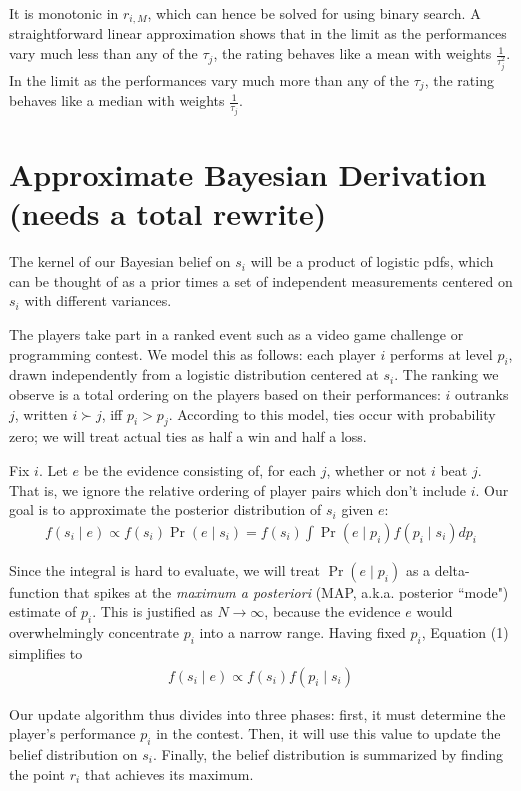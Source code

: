 \documentclass{article}
\begin{document}
It is monotonic in $r_{i,M}$, which can hence be solved for using binary search. A straightforward linear approximation shows that in the limit as the performances vary much less than any of the $\tau_j$, the rating behaves like a mean with weights $\frac{1}{\tau_j^2}$. In the limit as the performances vary much more than any of the $\tau_j$, the rating behaves like a median with weights $\frac{1}{\tau_j}$.

\section{Approximate Bayesian Derivation (needs a total rewrite)}

The kernel of our Bayesian belief on $s_i$ will be a product of logistic pdfs, which can be thought of as a prior times a set of independent measurements centered on $s_i$ with different variances.

The players take part in a ranked event such as a video game challenge or programming contest. We model this as follows: each player $i$ performs at level $p_i$, drawn independently from a logistic distribution centered at $s_i$. The ranking we observe is a total ordering on the players based on their performances: $i$ outranks $j$, written $i \succ j$, iff $p_i > p_j$. According to this model, ties occur with probability zero; we will treat actual ties as half a win and half a loss.

Fix $i$. Let $e$ be the evidence consisting of, for each $j$, whether or not $i$ beat $j$. That is, we ignore the relative ordering of player pairs which don't include $i$. Our goal is to approximate the posterior distribution of $s_i$ given $e$:
\begin{align}
f(s_i\mid e) \propto f(s_i)\Pr(e\mid s_i) = f(s_i)\int \Pr(e\mid p_i)f(p_i\mid s_i)dp_i
\end{align}

Since the integral is hard to evaluate, we will treat $\Pr(e\mid p_i)$ as a delta-function that spikes at the \emph{maximum a posteriori} (MAP, a.k.a. posterior ``mode") estimate of $p_i$. This is justified as $N \rightarrow \infty$, because the evidence $e$ would overwhelmingly concentrate $p_i$ into a narrow range. Having fixed $p_i$, Equation (1) simplifies to
\begin{align}
f(s_i\mid e) \propto f(s_i)f(p_i\mid s_i)
\end{align}

Our update algorithm thus divides into three phases: first, it must determine the player's performance $p_i$ in the contest. Then, it will use this value to update the belief distribution on $s_i$. Finally, the belief distribution is summarized by finding the point $r_i$ that achieves its maximum.
\end{document}
